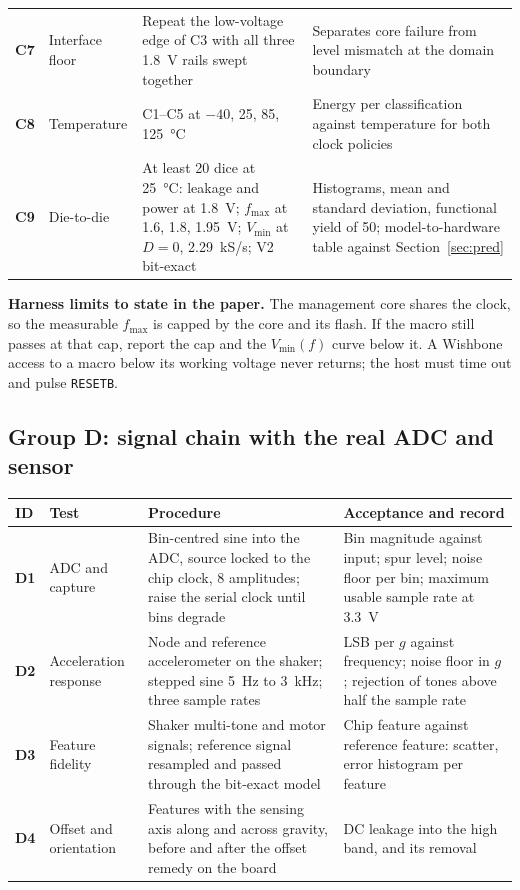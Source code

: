 \documentclass[10pt]{article}
\newcommand{\tid}[1]{\textbf{#1}}
\begin{document}
{\begin{longtable}{@{}L{0.8cm}L{3.3cm}L{6.6cm}L{4.3cm}@{}}
\tid{C7} & Interface floor & Repeat the low-voltage edge of C3 with all three \SI{1.8}{\volt} rails swept together & Separates core failure from level mismatch at the domain boundary\\
\tid{C8} & Temperature & C1--C5 at $-40$, 25, 85, \SI{125}{\celsius} & Energy per classification against temperature for both clock policies\\
\tid{C9} & Die-to-die & At least 20 dice at \SI{25}{\celsius}: leakage and power at \SI{1.8}{\volt}; $f_{\max}$ at 1.6, 1.8, \SI{1.95}{\volt}; $V_{\min}$ at $D=0$, \SI{2.29}{kS/s}; V2 bit-exact & Histograms, mean and standard deviation, functional yield of 50; model-to-hardware table against Section~\ref{sec:pred}\\
\bottomrule
\end{longtable}}

\noindent\textbf{Harness limits to state in the paper.} The management
core shares the clock, so the measurable $f_{\max}$ is capped by the core
and its flash. If the macro still passes at that cap, report the cap and
the $V_{\min}(f)$ curve below it. A Wishbone access to a macro below its
working voltage never returns; the host must time out and pulse
\texttt{RESETB}.

\subsection*{Group D: signal chain with the real ADC and sensor}
{\small
\begin{longtable}{@{}L{0.8cm}L{3.3cm}L{6.6cm}L{4.3cm}@{}}
\toprule
ID & Test & Procedure & Acceptance and record\\
\midrule
\endhead
\tid{D1} & ADC and capture & Bin-centred sine into the ADC, source locked to the chip clock, 8 amplitudes; raise the serial clock until bins degrade & Bin magnitude against input; spur level; noise floor per bin; maximum usable sample rate at \SI{3.3}{\volt}\\
\tid{D2} & Acceleration response & Node and reference accelerometer on the shaker; stepped sine 5~Hz to \SI{3}{\kilo\hertz}; three sample rates & LSB per $g$ against frequency; noise floor in $g$; rejection of tones above half the sample rate\\
\tid{D3} & Feature fidelity & Shaker multi-tone and motor signals; reference signal resampled and passed through the bit-exact model & Chip feature against reference feature: scatter, error histogram per feature\\
\tid{D4} & Offset and orientation & Features with the sensing axis along and across gravity, before and after the offset remedy on the board & DC leakage into the high band, and its removal\\
\bottomrule
\end{longtable}}
\end{document}
